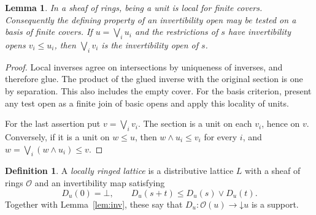 \documentclass[11pt]{amsart}
\newtheorem{lemma}[theorem]{Lemma}
\theoremstyle{definition}
\newtheorem{definition}[theorem]{Definition}
\theoremstyle{remark}
\newcommand{\OO}{\mathcal O}
\begin{document}
\begin{lemma}\label{lem:local-units}
In a sheaf of rings, being a unit is local for finite covers. Consequently
the defining property of an invertibility open may be tested on a basis
of finite covers. If $u=\bigvee_i u_i$ and the restrictions of $s$ have
invertibility opens $v_i\leq u_i$, then $\bigvee_i v_i$ is the
invertibility open of $s$.
\end{lemma}
\begin{proof}
Local inverses agree on intersections by uniqueness of inverses, and
therefore glue. The product of the glued inverse with the original
section is one by separation. This also includes the empty cover.
For the basis criterion, present any test open as a finite join of basic
opens and apply this locality of units.

For the last assertion put $v=\bigvee_i v_i$. The section is a unit on
each $v_i$, hence on $v$. Conversely, if it is a unit on $w\leq u$,
then $w\wedge u_i\leq v_i$ for every $i$, and
$w=\bigvee_i(w\wedge u_i)\leq v$.
\end{proof}

\begin{definition}
A \emph{locally ringed lattice} is a distributive lattice $L$ with a
sheaf of rings $\OO$ and an invertibility map satisfying
\[
 D_u(0)=\bot,\qquad D_u(s+t)\leq D_u(s)\vee D_u(t).
\]
Together with Lemma~\ref{lem:inv}, these say that
$D_u:\OO(u)\to\mathord\downarrow u$ is a support.
\end{definition}
\end{document}
